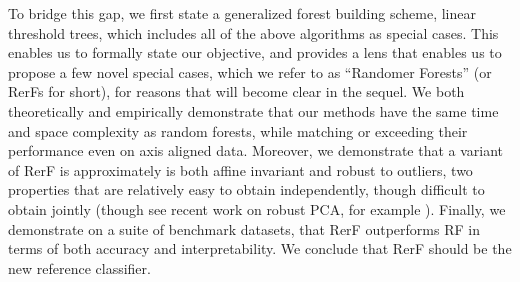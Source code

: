 \documentclass{article} %
\begin{document}
To bridge this gap, we first state a generalized forest building scheme, linear threshold trees, which includes all of the above algorithms as special cases.  This enables us to formally state our objective, and provides a lens that enables us to propose a few novel special cases, which we refer to as ``Randomer Forests''  (or RerFs for short), for reasons that will become clear in the sequel.  We both theoretically and empirically demonstrate that our methods have the same time and space complexity as random forests, while matching or exceeding their performance even on axis aligned data.  Moreover, we demonstrate that a variant of RerF is approximately is both affine invariant and robust to outliers, two properties that are relatively easy to obtain independently, though difficult to obtain jointly (though see recent work on robust PCA, for example \cite{Candes2009}). Finally, we demonstrate on a suite of benchmark datasets, that RerF outperforms RF in terms of both accuracy and interpretability.  We conclude that RerF should be the new reference classifier.




\end{document}
